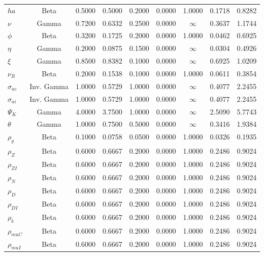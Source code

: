 \begin{center}
\begin{longtable}{lcccccccc}
$ {ha} $ & Beta & 0.5000 & 0.5000 & 0.2000 & 0.0000 & 1.0000 & 0.1718 & 0.8282 \\ 
$ \nu $ & Gamma & 0.7200 & 0.6332 & 0.2500 & 0.0000 & $\infty$ & 0.3637 & 1.1744 \\ 
$ {\phi} $ & Beta & 0.3200 & 0.1725 & 0.2000 & 0.0000 & 1.0000 & 0.0462 & 0.6925 \\ 
$ {\eta} $ & Gamma & 0.2000 & 0.0875 & 0.1500 & 0.0000 & $\infty$ & 0.0304 & 0.4926 \\ 
$ \xi $ & Gamma & 0.8500 & 0.8382 & 0.1000 & 0.0000 & $\infty$ & 0.6925 & 1.0209 \\ 
$ {\nu_R} $ & Beta & 0.2000 & 0.1538 & 0.1000 & 0.0000 & 1.0000 & 0.0611 & 0.3854 \\ 
$ {\sigma_{ac}} $ & Inv. Gamma & 1.0000 & 0.5729 & 1.0000 & 0.0000 & $\infty$ & 0.4077 & 2.2455 \\ 
$ {\sigma_{ai}} $ & Inv. Gamma & 1.0000 & 0.5729 & 1.0000 & 0.0000 & $\infty$ & 0.4077 & 2.2455 \\ 
$ {\Psi_{K}} $ & Gamma & 4.0000 & 3.7500 & 1.0000 & 0.0000 & $\infty$ & 2.5090 & 5.7743 \\ 
$ {\theta} $ & Gamma & 1.0000 & 0.7500 & 0.5000 & 0.0000 & $\infty$ & 0.3416 & 1.9384 \\ 
$ {\rho_g} $ & Beta & 0.1000 & 0.0758 & 0.0500 & 0.0000 & 1.0000 & 0.0326 & 0.1935 \\ 
$ {\rho_Z} $ & Beta & 0.6000 & 0.6667 & 0.2000 & 0.0000 & 1.0000 & 0.2486 & 0.9024 \\ 
$ {\rho_{ZI}} $ & Beta & 0.6000 & 0.6667 & 0.2000 & 0.0000 & 1.0000 & 0.2486 & 0.9024 \\ 
$ {\rho_N} $ & Beta & 0.6000 & 0.6667 & 0.2000 & 0.0000 & 1.0000 & 0.2486 & 0.9024 \\ 
$ {\rho_D} $ & Beta & 0.6000 & 0.6667 & 0.2000 & 0.0000 & 1.0000 & 0.2486 & 0.9024 \\ 
$ {\rho_{DI}} $ & Beta & 0.6000 & 0.6667 & 0.2000 & 0.0000 & 1.0000 & 0.2486 & 0.9024 \\ 
$ {\rho_b} $ & Beta & 0.6000 & 0.6667 & 0.2000 & 0.0000 & 1.0000 & 0.2486 & 0.9024 \\ 
$ {\rho_{muC}} $ & Beta & 0.6000 & 0.6667 & 0.2000 & 0.0000 & 1.0000 & 0.2486 & 0.9024 \\ 
$ {\rho_{muI}} $ & Beta & 0.6000 & 0.6667 & 0.2000 & 0.0000 & 1.0000 & 0.2486 & 0.9024 \\ 
\end{longtable}
 \end{center}
